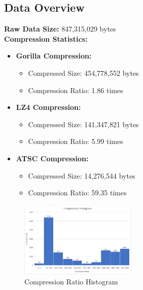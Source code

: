 \documentclass[conference]{IEEEtran}
\begin{document}
\subsection*{Data Overview}

\textbf{Raw Data Size:} 847,315,029 bytes \\
\textbf{Compression Statistics:}

\begin{itemize}
    \item \textbf{Gorilla Compression:}
    \begin{itemize}
        \item Compressed Size: 454,778,552 bytes
        \item Compression Ratio: 1.86 times
    \end{itemize}
    \item \textbf{LZ4 Compression:}
    \begin{itemize}
        \item Compressed Size: 141,347,821 bytes
        \item Compression Ratio: 5.99 times
    \end{itemize}
    \item \textbf{ATSC Compression:}
    \begin{itemize}
        \item Compressed Size: 14,276,544 bytes
        \item Compression Ratio: 59.35 times
    \end{itemize}
\end{itemize}





\begin{figure}[h]
  \centering
  \includegraphics[width=0.5\textwidth]{Fig5.png}
  \caption{Compression Ratio Histogram}
  \label{Fig.6}
\end{figure}
\end{document}
